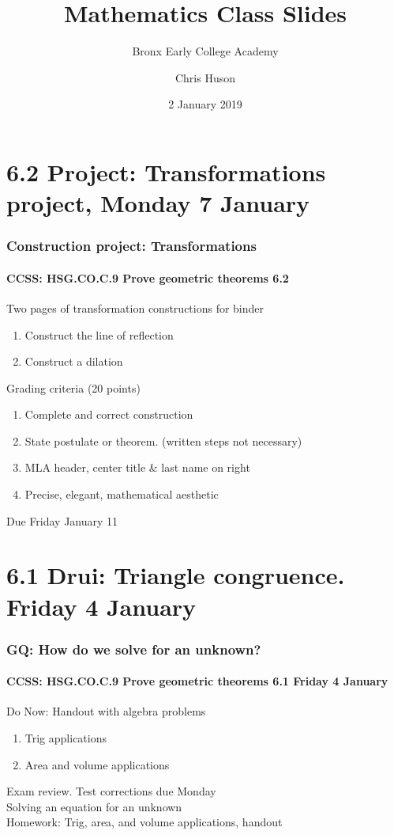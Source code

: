 \documentclass{beamer}
\title{Mathematics Class Slides}
\subtitle{Bronx Early College Academy}
\author{Chris Huson}
\date{2 January 2019}
\begin{document}
\frame{\titlepage}
\section[Outline]{}
\frame{\tableofcontents}


\section{6.2 Project: Transformations project, Monday 7 January}
  \frame
  {
    \frametitle{Construction project: Transformations}
    \framesubtitle{CCSS: HSG.CO.C.9 Prove geometric theorems  \alert{6.2}}

    \begin{block}{Two pages of transformation constructions for binder}
    \begin{enumerate}
        \item Construct the line of reflection
        \item Construct a dilation
    \end{enumerate}
        Grading criteria (20 points)
    \begin{enumerate}
        \item Complete and correct construction
        \item State postulate or theorem. (written steps not necessary)
        \item MLA header, center title \& last name on right
        \item Precise, elegant, mathematical aesthetic
    \end{enumerate}
    \end{block}
    Due Friday January 11
    }

\section{6.1 Drui: Triangle congruence. Friday 4 January}
  \frame
  {
    \frametitle{GQ: How do we solve for an unknown?}
    \framesubtitle{CCSS: HSG.CO.C.9 Prove geometric theorems  \alert{6.1 Friday 4 January}}

    \begin{block}{Do Now: Handout with algebra problems}
      \begin{enumerate}
        \item Trig applications
        \item Area and volume applications
      \end{enumerate}
    \end{block}
    Exam review. Test corrections due Monday \\
    Solving an equation for an unknown \\[0.5cm]
    Homework: Trig, area, and volume applications, handout\\
  }
\end{document}

